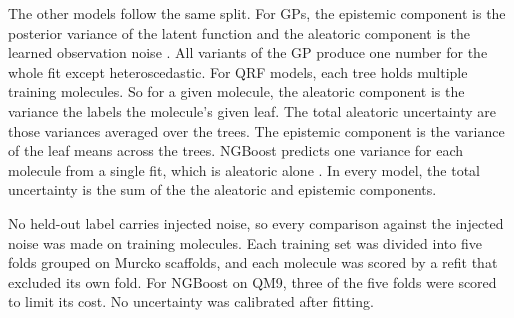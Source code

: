 The other models follow the same split. For GPs, the epistemic component is the posterior variance of the latent function and the aleatoric component is the learned observation noise \citep{Rasmussen2005}. All variants of the GP produce one number for the whole fit except heteroscedastic. For QRF models, each tree holds multiple training molecules. So for a given molecule, the aleatoric component is the variance the labels the molecule's given leaf. The total aleatoric uncertainty are those variances averaged over the trees. The epistemic component is the variance of the leaf means across the trees. NGBoost predicts one variance for each molecule from a single fit, which is aleatoric alone \citep{Duan2020}. In every model, the total uncertainty is the sum of the the aleatoric and epistemic components.

No held-out label carries injected noise, so every comparison against the injected noise was made on
training molecules. Each training set was divided into five folds grouped on Murcko scaffolds, and each
molecule was scored by a refit that excluded its own fold. For NGBoost on QM9, three of the five folds
were scored to limit its cost. No uncertainty was calibrated after fitting.


